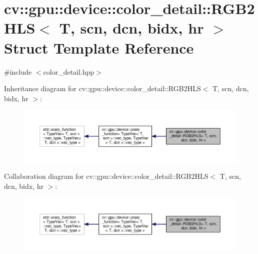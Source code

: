 \hypertarget{structcv_1_1gpu_1_1device_1_1color__detail_1_1RGB2HLS}{\section{cv\-:\-:gpu\-:\-:device\-:\-:color\-\_\-detail\-:\-:R\-G\-B2\-H\-L\-S$<$ T, scn, dcn, bidx, hr $>$ Struct Template Reference}
\label{structcv_1_1gpu_1_1device_1_1color__detail_1_1RGB2HLS}
}


{\ttfamily \#include $<$color\-\_\-detail.\-hpp$>$}



Inheritance diagram for cv\-:\-:gpu\-:\-:device\-:\-:color\-\_\-detail\-:\-:R\-G\-B2\-H\-L\-S$<$ T, scn, dcn, bidx, hr $>$\-:\nopagebreak
\begin{figure}[H]
\begin{center}
\leavevmode
\includegraphics[width=350pt]{structcv_1_1gpu_1_1device_1_1color__detail_1_1RGB2HLS__inherit__graph}
\end{center}
\end{figure}


Collaboration diagram for cv\-:\-:gpu\-:\-:device\-:\-:color\-\_\-detail\-:\-:R\-G\-B2\-H\-L\-S$<$ T, scn, dcn, bidx, hr $>$\-:\nopagebreak
\begin{figure}[H]
\begin{center}
\leavevmode
\includegraphics[width=350pt]{structcv_1_1gpu_1_1device_1_1color__detail_1_1RGB2HLS__coll__graph}
\end{center}
\end{figure}
